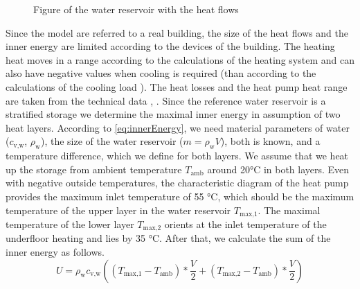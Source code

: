     \begin{figure}
        \centering
        \def\svgwidth{120pt}
        
        \caption{Figure of the water reservoir with the heat flows}
        \label{fig:Figure of the water reservoir with the heat flows}
    \end{figure}
    
    Since the model are referred to a real building, the size of the heat flows and the inner energy are limited according to the devices of the building. The heating heat moves in a range according to the calculations of the heating system \cite{Roth_Auslegung.2020} and can also have negative values when cooling is required (than according to the calculations of the cooling load \cite{SEFIngenieurgesellschaftMBH.2019}). The heat losses and the heat pump heat range are taken from the technical data \cite{Oskar}, \cite{TUM}.\newline
    Since the reference water reservoir is a stratified storage we determine the maximal inner energy in assumption of two heat layers. According to \autoref{eq:innerEnergy}, we need material parameters of water ($c_\text{v,w}$, $\rho_\text{w}$), the size of the water reservoir ($m = \rho_\text{w} V$), both is known, and a temperature difference, which we define for both layers. We assume that we heat up the storage from ambient temperature $T_\text{amb}$ around 20°C in both layers. Even with negative outside temperatures, the characteristic diagram of the heat pump provides the maximum inlet temperature of 55 °C, which should be the maximum temperature of the upper layer in the water reservoir $T_\text{max,1}$. The maximal temperature of the lower layer $T_\text{max,2}$ orients at the inlet temperature of the underfloor heating and lies by 35 °C. After that, we calculate the sum of the inner energy as follows.
    \begin{equation}
        \label{eq:max.Energie}
        U = \rho_\text{w} c_\text{v,w} ((T_\text{max,1}-T_\text{amb})*\frac{V}{2} + (T_\text{max,2}-T_\text{amb})*\frac{V}{2}) 
    \end{equation}

